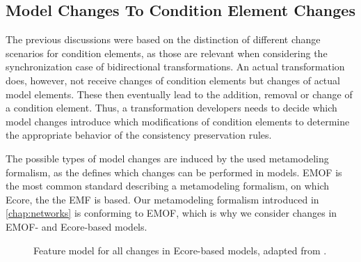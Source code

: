 

\subsection{Model Changes To Condition Element Changes}
\label{chap:synchronization:achieving:changes}

The previous discussions were based on the distinction of different change scenarios for condition elements, as those are relevant when considering the synchronization case of bidirectional transformations.
An actual transformation does, however, not receive changes of condition elements but changes of actual model elements.
These then eventually lead to the addition, removal or change of a condition element.
Thus, a transformation developers needs to decide which model changes introduce which modifications of condition elements to determine the appropriate behavior of the consistency preservation rules.

The possible types of model changes are induced by the used metamodeling formalism, as the \metametamodel defines which changes can be performed in models.
\gls{EMOF} is the most common standard describing a metamodeling formalism, on which Ecore, the \metametamodel the \gls{EMF} is based.
Our metamodeling formalism introduced in \autoref{chap:networks} is conforming to \gls{EMOF}, which is why we consider changes in \gls{EMOF}- and Ecore-based models.


\begin{figure}
    \centering
    
    \caption[Feature model for changes in Ecore-based models]{Feature model for all changes in Ecore-based models, adapted from \cite[Fig. 5.3]{kramer2017a}.}
    \label{fig:synchronization:change_feature_model}
\end{figure}

